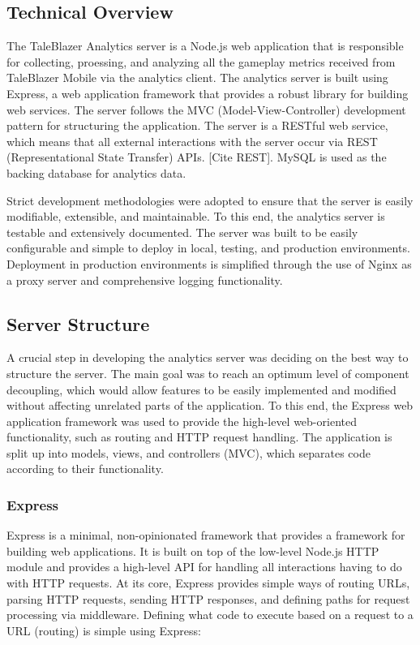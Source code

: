 \subsection{Technical Overview}

The TaleBlazer Analytics server is a Node.js web application that is responsible for collecting, proessing, and analyzing all the gameplay metrics received from TaleBlazer Mobile via the analytics client. The analytics server is built using Express, a web application framework that provides a robust library for building web services. The server follows the MVC (Model-View-Controller) development pattern for structuring the application. The server is a RESTful web service, which means that all external interactions with the server occur via REST (Representational State Transfer) APIs. [Cite REST]. MySQL is used as the backing database for analytics data.

Strict development methodologies were adopted to ensure that the server is easily modifiable, extensible, and maintainable. To this end, the analytics server is testable and extensively documented. The server was built to be easily configurable and simple to deploy in local, testing, and production environments. Deployment in production environments is simplified through the use of Nginx as a proxy server and comprehensive logging functionality.

\subsection{Server Structure}

A crucial step in developing the analytics server was deciding on the best way to structure the server. The main goal was to reach an optimum level of component decoupling, which would allow features to be easily implemented and modified without affecting unrelated parts of the application. To this end, the Express web application framework was used to provide the high-level web-oriented functionality, such as routing and HTTP request handling. The application is split up into models, views, and controllers (MVC), which separates code according to their functionality. 

\subsubsection{Express}
Express is a minimal, non-opinionated framework that provides a framework for building web applications. It is built on top of the low-level Node.js HTTP module and provides a high-level API for handling all interactions having to do with HTTP requests. At its core, Express provides simple ways of routing URLs, parsing HTTP requests, sending HTTP responses, and defining paths for request processing via middleware. Defining what code to execute based on a request to a URL (routing) is simple using Express:

